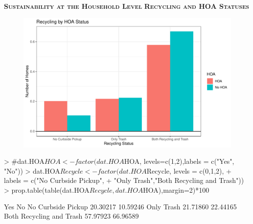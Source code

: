 \documentclass{article}
\begin{document}
\newpage
\textsc{\textbf{Sustainability at the Household Level}}
\newline
\newline
\textsc{\textbf{Recycling and HOA Statuses}}
\newline
\newline
\begin{figure}[H]
		\centering
\includegraphics{exam23-009}
		\label{Fig:plot2}
	\end{figure}
\begin{Schunk}
\begin{Sinput}
> #dat.HOA$HOA<-factor(dat.HOA$HOA, levels=c(1,2),labels = c("Yes", "No"))
> dat.HOA$Recycle<-factor(dat.HOA$Recycle, levels = c(0,1,2),
+                         labels = c("No Curbside Pickup",
+                         "Only Trash","Both Recycling and Trash"))
> prop.table(table(dat.HOA$Recycle, dat.HOA$HOA),margin=2)*100
\end{Sinput}
\begin{Soutput}
                                Yes       No
  No Curbside Pickup       20.30217 10.59246
  Only Trash               21.71860 22.44165
  Both Recycling and Trash 57.97923 66.96589
\end{Soutput}
\end{Schunk}
\end{document}
